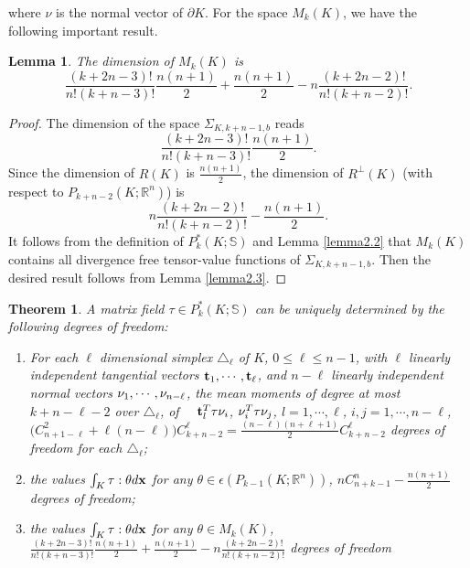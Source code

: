\documentclass{amsart}
\newtheorem{theorem}{Theorem}[section]
\newtheorem{lemma}{Lemma}[section]
\numberwithin{table}{section}
\numberwithin{figure}{section}
\begin{document}
  where $\nu$ is the   normal vector of $\partial K$. For the space $M_k(K)$, we have the following important result.
  \begin{lemma} The dimension of $M_k(K)$ is
  \begin{equation}\label{eq3.17}
   \frac{(k+2n-3)!}{n!(k+n-3)!}\frac{n(n+1)}{2}+\frac{n(n+1)}{2}-n\frac{(k+2n-2)!}{n!(k+n-2)!}.
  \end{equation}
  \end{lemma}
  \begin{proof} The dimension of the space $\Sigma_{K, k+n-1, b}$ reads
  \begin{equation}
  \frac{(k+2n-3)!}{n!(k+n-3)!}\frac{n(n+1)}{2}.
  \end{equation}
  Since the dimension of $R(K)$ is $\frac{n(n+1)}{2}$, the dimension of $R^\perp(K)$ (with respect to $P_{k+n-2}(K;  \mathbb{R}^n)$) is
  \begin{equation}
  n\frac{(k+2n-2)!}{n!(k+n-2)!}-\frac{n(n+1)}{2}.
  \end{equation}
  It follows from the definition of $P_k^\ast(K; \mathbb{S})$ and Lemma \ref{lemma2.2} that $M_k(K)$ contains all divergence free  tensor-value functions of  $\Sigma_{K, k+n-1, b}$. Then the desired result follows from Lemma \ref{lemma2.3}.
  \end{proof}
\begin{theorem} A  matrix field  $\tau\in P_k^\ast(K; \mathbb{S})$ can be uniquely determined by the following degrees of
 freedom:
\begin{enumerate}
 \item For each $\ell$ dimensional simplex $\triangle_\ell$ of $K$, $0\leq \ell\leq n-1$,  with $\ell$ linearly independent tangential vectors $\mathbf{t}_1, \cdots, \mathbf{t}_\ell$, and $n-\ell$ linearly  independent normal vectors $\mathbf{\nu}_1, \cdots, \mathbf{\nu}_{n-\ell}$, the mean moments of degree at most $k+n-\ell-2$ over $\triangle_\ell$, of~~ $\mathbf{t}_l^T\tau \mathbf{\nu}_i$, $\mathbf{\nu}_i^T\tau\mathbf{\nu}_j$, $l=1, \cdots, \ell$, $i,j=1, \cdots, n-\ell$,  $\big( C_{n+1-\ell}^2+\ell (n-\ell)\big) C_{k+n-2}^\ell=\frac{(n-\ell)(n+\ell+1)}{2}C_{k+n-2}^\ell$ degrees of freedom  for each $\triangle_\ell$;
 \item the values $\int_K \tau: \theta d\mathbf{x}$ for any $\theta \in \epsilon(P_{k-1}(K;  \mathbb{R}^n))$, $nC_{n+k-1}^n-\frac{n(n+1)}{2}$ degrees of freedom;
 \item the values $\int_K \tau: \theta d\mathbf{x}$ for any $\theta \in M_k(K)$,  $\frac{(k+2n-3)!}{n!(k+n-3)!}\frac{n(n+1)}{2}+\frac{n(n+1)}{2}-n\frac{(k+2n-2)!}{n!(k+n-2)!}$ degrees of freedom
 \end{enumerate}
  \end{theorem}
\end{document}
